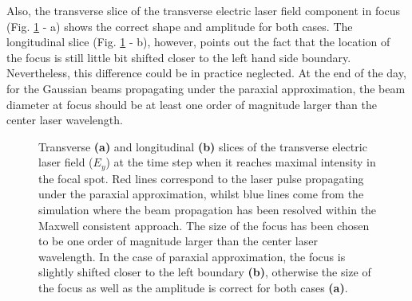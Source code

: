 Also, the transverse slice of the transverse electric laser field component in focus (Fig. \ref{fig:6} - a) shows the correct shape and amplitude for both cases. The longitudinal slice (Fig. \ref{fig:6} - b), however, points out the fact that the location of the focus is still little bit shifted closer to the left hand side boundary. Nevertheless, this difference could be in practice neglected. At the end of the day, for the Gaussian beams propagating under the paraxial approximation, the beam diameter at focus should be at least one order of magnitude larger than the center laser wavelength.

\begin{figure}[h!]
	\centering
	\hspace{1mm}
	\caption{Transverse \textbf{(a)} and longitudinal \textbf{(b)} slices of the transverse electric laser field ($ E_{y} $) at the time step when it reaches maximal intensity in the focal spot. Red lines correspond to the laser pulse propagating under the paraxial approximation, whilst blue lines come from the simulation where the beam propagation has been resolved within the Maxwell consistent approach. The size of the focus has been chosen to be one order of magnitude larger than the center laser wavelength. In the case of paraxial approximation, the focus is slightly shifted closer to the left boundary \textbf{(b)}, otherwise the size of the focus as well as the amplitude is correct for both cases \textbf{(a)}.}
	\label{fig:6}
\end{figure}

